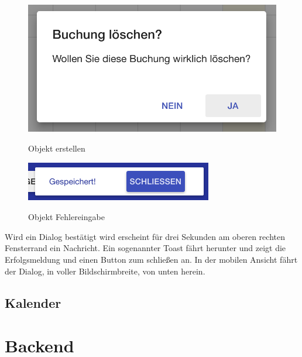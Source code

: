 \begin{figure}[H]
    \centering
    \begin{minipage}[t]{0.49\linewidth}
        \centering
        \includegraphics[width=\linewidth]{images/frontend_booking_delete_dialog.png}
        \label{frontend_booking_delete_dialog}
        \caption{Objekt erstellen}
    \end{minipage}%
    \hfill
    \begin{minipage}[t]{0.49\linewidth}
        \centering
        \includegraphics[width=\linewidth]{images/frontend_toast.png}
        \label{frontend_toast}
        \caption{Objekt Fehlereingabe}
    \end{minipage}
\end{figure}


Wird ein Dialog bestätigt wird erscheint für drei Sekunden am oberen rechten Fensterrand ein Nachricht. Ein sogenannter Toast fährt herunter und zeigt die Erfolgsmeldung und einen Button zum schließen an. In der mobilen Ansicht fährt der Dialog, in voller Bildschirmbreite, von unten herein. 

\subsection{Kalender}

 
\section{Backend}

